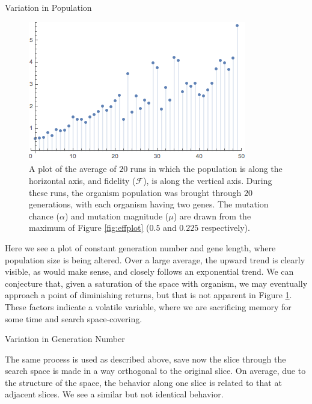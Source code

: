 \documentclass[14pt]{beamer}
\renewcommand{\maketitle}{%
	\begin{center}%
		\Huge\inserttitle\\[5mm]%
		\Large\insertauthor\\[5mm]%
		\Large\insertinstitute%
	\end{center}%
	\vspace*{-1.5ex}%
}
\begin{document}
\begin{frame}{\maketitle}
\begin{columns}
\begin{column}{.45\textwidth}
\begin{block}{Variation in Population}
	\begin{figure}[htpb]
		\centering
			\includegraphics[scale=1.3]{g1.png}
		\centering
		\caption{A plot of the average of $20$ runs in which the population is along the horizontal axis, and fidelity ($\mathcal{F}$), is along the vertical axis. During these runs, the organism population was brought through $20$ generations, with each organism having two genes. The mutation chance ($\alpha$) and mutation magnitude ($\mu$) are drawn from the maximum of Figure \ref{fig:effplot} ($0.5$ and $0.225$ respectively).}
		\label{fig:pop_plot}
	\end{figure}

	Here we see a plot of constant generation number and gene length, where population size is being altered. Over a large average, the upward trend is clearly visible, as would make sense, and closely follows an exponential trend. We can conjecture that, given a saturation of the space with organism, we may eventually approach a point of diminishing returns, but that is not apparent in Figure \ref{fig:pop_plot}. These factors indicate a volatile variable, where we are sacrificing memory for some time and search space-covering. 
\end{block}
\vspace{1em}
\begin{exampleblock}{Variation in Generation Number}

	The same process is used as described above, save now the slice through the search space is made in a way orthogonal to the original slice. On average, due to the structure of the space, the behavior along one slice is related to that at adjacent slices. We see a similar but not identical behavior. 


\end{exampleblock}
\end{column}
\end{columns}
\end{frame}
\end{document}

